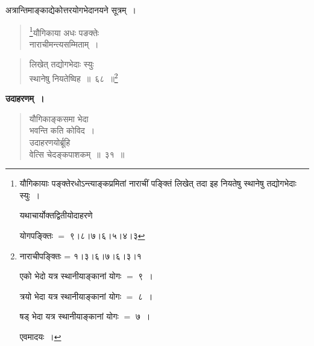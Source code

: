 \documentclass[11pt, openany]{book}
\begin{document}
अत्रान्तिमाङ्काद्येकोत्तरयोगभेदानयने सूत्रम्~।\\

\begin{quote}
\renewcommand{\thefootnote}{१}\footnote{यौगिकायाः पङ्क्तेरधोऽन्त्याङ्कप्रमितां नाराचीं पङ्क्तिं लिखेत् तदा इह नियतेषु स्थानेषु तद्योगभेदाः स्युः~।

\hspace{3mm} यथाचार्योक्तद्वितीयोदाहरणे\textemdash

\hspace{3mm} योगपङ्क्तिः $=$ ९।८।७।६।५।४।३}{\gk यौगिकाया अधः पङक्तेः\\
नाराचीमन्त्यसम्मिताम्~।}	
\end{quote}

\newpage

\begin{quote}
{\gk लिखेत् तद्योगभेदाः स्युः\\
स्थानेषु नियतेष्विह~॥~६८~॥}\renewcommand{\thefootnote}{}\footnote{नाराचीपङ्क्तिः = १।३।६।७।६।३।१

\hspace{3mm} एको भेदो यत्र स्थानीयाङ्कानां योगः $=$ ९~।

\hspace{3mm} त्रयो भेदा यत्र स्थानीयाङ्कानां योगः $=$ ८~।

\hspace{3mm} षड् भेदा यत्र स्थानीयाङ्कानां योगः $=$ ७~।

एवमादयः~।}
\end{quote}

\textbf{उदाहरणम्~।}
\begin{quote}
{\ex यौगिकाङ्कसमा भेदा\\
भवन्ति कति कोविद~।\\
उदाहरणयोर्ब्रूहि\\
वेत्सि चेदङ्कपाशकम्~॥~३१~॥}
\end{quote}
\end{document}
